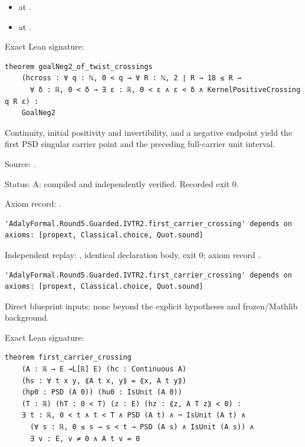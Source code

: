 \begin{theorem}[bp-050]
\begin{itemize}
\item \texttt{} at \texttt{}.
\item \texttt{} at \texttt{}.
\end{itemize}
\par Exact Lean signature:
\begin{verbatim}
theorem goalNeg2_of_twist_crossings
    (hcross : ∀ q : ℕ, 0 < q → ∀ R : ℕ, 2 ∣ R → 18 ≤ R →
      ∀ δ : ℝ, 0 < δ → ∃ ε : ℝ, 0 < ε ∧ ε < δ ∧ KernelPositiveCrossing q R ε) :
    GoalNeg2
\end{verbatim}
\end{theorem}

\begin{theorem}[bp-051]
\label{bp-051}
\uses{}
\leanok
Continuity, initial positivity and invertibility, and a negative endpoint yield the first PSD singular carrier point and the preceding full-carrier unit interval.

\par Source: \texttt{}.
\par Status: A: compiled and independently verified. Recorded exit 0.
\par Axiom record: \texttt{}.
\begin{verbatim}
'AdalyFormal.Round5.Guarded.IVTR2.first_carrier_crossing' depends on axioms: [propext, Classical.choice, Quot.sound]
\end{verbatim}
\par Independent replay: \texttt{}, identical declaration body, exit 0; axiom record \texttt{}.
\begin{verbatim}
'AdalyFormal.Round5.Guarded.IVTR2.first_carrier_crossing' depends on axioms: [propext, Classical.choice, Quot.sound]
\end{verbatim}
\par Direct blueprint inputs: none beyond the explicit hypotheses and frozen/Mathlib background.
\par Exact Lean signature:
\begin{verbatim}
theorem first_carrier_crossing
    (A : ℝ → E →L[ℝ] E) (hc : Continuous A)
    (hs : ∀ t x y, ⟪A t x, y⟫ = ⟪x, A t y⟫)
    (hp0 : PSD (A 0)) (hu0 : IsUnit (A 0))
    (T : ℝ) (hT : 0 < T) (z : E) (hz : ⟪z, A T z⟫ < 0) :
    ∃ t : ℝ, 0 < t ∧ t < T ∧ PSD (A t) ∧ ¬ IsUnit (A t) ∧
      (∀ s : ℝ, 0 ≤ s → s < t → PSD (A s) ∧ IsUnit (A s)) ∧
      ∃ v : E, v ≠ 0 ∧ A t v = 0
\end{verbatim}
\end{theorem}

